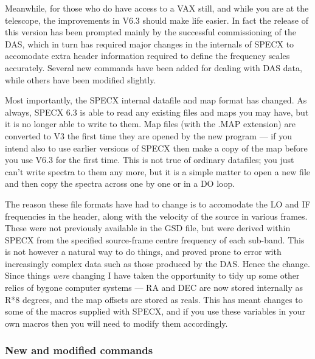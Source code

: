 \documentclass[twoside,11pt]{article}
\renewcommand{\_}{\texttt{\symbol{95}}}
\begin{document}
Meanwhile, for those who do have access to a VAX still, and while
you are at the telescope, the improvements in V6.3 should make life
easier. In fact the release of this version has been prompted mainly
by the successful commissioning of the DAS, which in turn has required
major changes in the internals of SPECX to accomodate extra header
information required to define the frequency scales accurately.
Several new commands have been added for dealing with DAS data, while
others have been modified slightly.

Most importantly, the SPECX internal datafile and map format has changed.
As always, SPECX 6.3 is able to read any existing files and maps you may have,
but it is no longer able to write to them. Map files (with the .MAP 
extension) are converted to V3 the first time they are opened by the
new program --- if you intend also to use earlier versions of SPECX then
make a copy of the map before you use V6.3 for the first time. This is
not true of ordinary datafiles; you just can't write spectra to them 
any more, but it is a simple matter to open a new file and then copy the
spectra across one by one or in a DO loop.


The reason these file formats have had to change is to accomodate the
LO and IF frequencies in the header, along with the velocity of the
source in various frames. These were not previously available in the
GSD file, but were derived within SPECX from the specified source-frame
centre frequency of each sub-band. This is not however a natural way to
do things, and proved prone to error with increasingly complex data
such as those produced by the DAS. Hence the change. Since things \emph{were}
changing I have taken the opportunity to tidy up some other relics of
bygone computer systems --- RA and DEC are now stored internally as R*8
degrees, and the map offsets are stored as reals. This has meant
changes to some of the macros supplied with SPECX, and if you use these
variables in your own macros then you will need to modify them
accordingly.

\subsubsection{New and modified commands}
\end{document}
